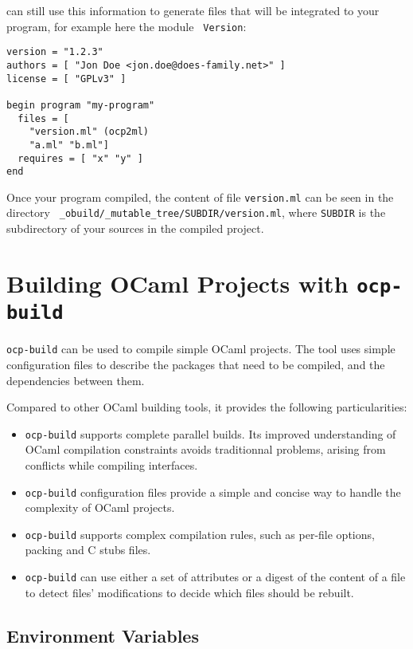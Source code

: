 \ocpbuild{} can still use this information to generate files that will
be integrated to your program, for example here the module {\tt
  Version}:
\begin{verbatim}
version = "1.2.3"
authors = [ "Jon Doe <jon.doe@does-family.net>" ]
license = [ "GPLv3" ]

begin program "my-program"
  files = [ 
    "version.ml" (ocp2ml)
    "a.ml" "b.ml"]
  requires = [ "x" "y" ]
end
\end{verbatim}

Once your program compiled, the content of file {\tt version.ml} can
be seen in the directory {\tt
  \_obuild/\_mutable\_tree/SUBDIR/version.ml}, where {\tt SUBDIR} is
the subdirectory of your sources in the compiled project.


\chapter{Building OCaml Projects with {\tt ocp-build}}

{\tt ocp-build} can be used to compile simple OCaml projects.
The tool uses simple configuration files to describe the
packages that need to be compiled, and the dependencies between
them.

Compared to other OCaml building tools, it provides the following
particularities:
\begin{itemize}
\item {\tt ocp-build} supports complete parallel builds. Its improved
  understanding of OCaml compilation constraints avoids traditionnal
  problems, arising from conflicts while compiling interfaces.
\item {\tt ocp-build} configuration files provide a simple and concise
  way to handle the complexity of OCaml projects.
\item {\tt ocp-build} supports complex compilation rules, such as
  per-file options, packing and C stubs files.
\item {\tt ocp-build} can use either a set of attributes or a digest
  of the content of a file to detect files' modifications to decide
  which files should be rebuilt.
\end{itemize}

\section{Environment Variables}

